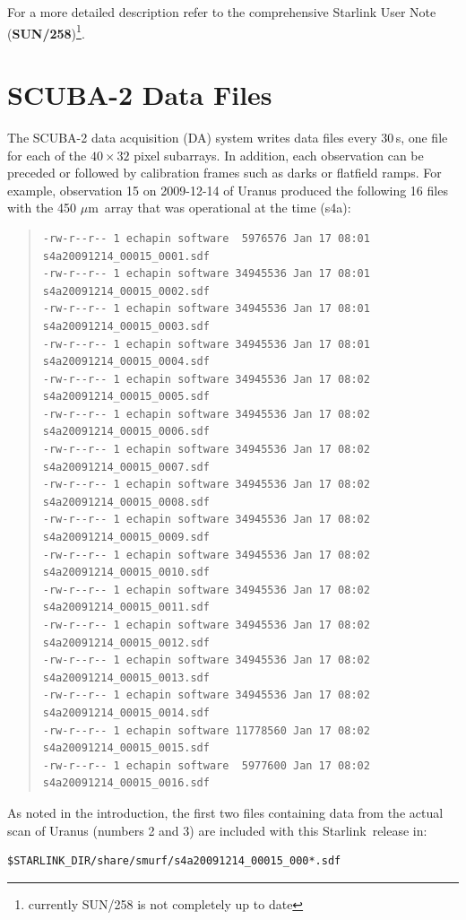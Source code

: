\documentclass[twoside,11pt]{article}
\newcommand{\micron}{\mbox{\,${\mu}$m}}            %
\newcommand{\htmladdnormallink}[2]{#1}
\newcommand{\xref}[3]{#1}
\newcommand{\xlabel}[1]{}
\renewcommand{\_}{\texttt{\symbol{95}}}
\newenvironment{myquote}{\begin{quote}\begin{small}}{\end{small}\end{quote}}
\newcommand{\starlink}{\htmladdnormallink{Starlink}{http://starlink.jach.hawaii.edu}}
\begin{document}
For a more detailed description refer to the comprehensive Starlink
User Note (\xref{\textbf{SUN/258}}{sun258}{})\footnote{currently
  SUN/258 is not completely up to date}.


\section{\xlabel{data_files}SCUBA-2 Data Files}
\label{sec:data}

The SCUBA-2 data acquisition (DA) system writes data files every
30\,s, one file for each of the $40\times32$ pixel subarrays. In
addition, each observation can be preceded or followed by calibration
frames such as darks or flatfield ramps. For example, observation 15
on 2009-12-14 of Uranus produced the following 16 files with the
450\,\micron\ array that was operational at the time (s4a):

\begin{myquote}
\begin{verbatim}
-rw-r--r-- 1 echapin software  5976576 Jan 17 08:01 s4a20091214_00015_0001.sdf
-rw-r--r-- 1 echapin software 34945536 Jan 17 08:01 s4a20091214_00015_0002.sdf
-rw-r--r-- 1 echapin software 34945536 Jan 17 08:01 s4a20091214_00015_0003.sdf
-rw-r--r-- 1 echapin software 34945536 Jan 17 08:01 s4a20091214_00015_0004.sdf
-rw-r--r-- 1 echapin software 34945536 Jan 17 08:02 s4a20091214_00015_0005.sdf
-rw-r--r-- 1 echapin software 34945536 Jan 17 08:02 s4a20091214_00015_0006.sdf
-rw-r--r-- 1 echapin software 34945536 Jan 17 08:02 s4a20091214_00015_0007.sdf
-rw-r--r-- 1 echapin software 34945536 Jan 17 08:02 s4a20091214_00015_0008.sdf
-rw-r--r-- 1 echapin software 34945536 Jan 17 08:02 s4a20091214_00015_0009.sdf
-rw-r--r-- 1 echapin software 34945536 Jan 17 08:02 s4a20091214_00015_0010.sdf
-rw-r--r-- 1 echapin software 34945536 Jan 17 08:02 s4a20091214_00015_0011.sdf
-rw-r--r-- 1 echapin software 34945536 Jan 17 08:02 s4a20091214_00015_0012.sdf
-rw-r--r-- 1 echapin software 34945536 Jan 17 08:02 s4a20091214_00015_0013.sdf
-rw-r--r-- 1 echapin software 34945536 Jan 17 08:02 s4a20091214_00015_0014.sdf
-rw-r--r-- 1 echapin software 11778560 Jan 17 08:02 s4a20091214_00015_0015.sdf
-rw-r--r-- 1 echapin software  5977600 Jan 17 08:02 s4a20091214_00015_0016.sdf
\end{verbatim}
\end{myquote}

As noted in the introduction, the first two files containing data from
the actual scan of Uranus (numbers 2 and 3) are included with this
\starlink\ release in:
\begin{verbatim}
$STARLINK_DIR/share/smurf/s4a20091214_00015_000*.sdf
\end{verbatim}
\end{document}
